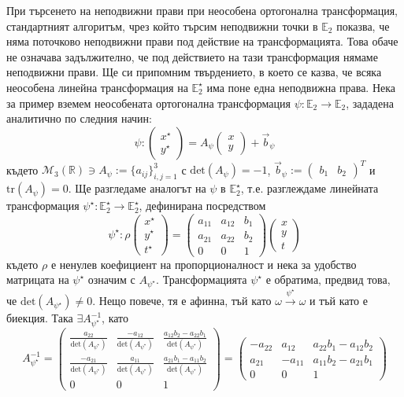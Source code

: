 \documentclass[12pt]{article}
\begin{document}
При търсенето на неподвижни прави при неособена ортогонална трансформация, стандартният алгоритъм, чрез който търсим неподвижни точки в $\mathbb{E}_2$ показва, че няма поточково неподвижни прави под действие на трансформацията. Това обаче не означава задължително, че под действието на тази трансформация нямаме неподвижни прави. Ще си припомним твърдението, в което се казва, че всяка неособена линейна трансформация на $\mathbb{E}_2^\star$ има поне една неподвижна права. Нека за пример вземем неособената ортогонална трансформация $\psi:\mathbb{E}_2\to\mathbb{E}_2$, зададена аналитично по следния начин: $$\psi:\begin{pmatrix} x^\star \\ y^\star\end{pmatrix}=A_\psi\begin{pmatrix} x \\ y \end{pmatrix}+\vec{b}_\psi$$ където $\mathcal M_3(\mathbb{R})\ni A_{\psi}:=\{a_{ij}\}_{i,j=1}^3$ с $\mathrm{det}(A_\psi)=-1$, $\vec{b}_\psi:=\begin{pmatrix} b_1 & b_2\end{pmatrix}^T$ и $\mathrm{tr}(A_{\psi})=0$. Ще разгледаме аналогът на $\psi$ в $\mathbb{E}_2^\star$, т.е. разглеждаме линейната трансформация $\psi^\star:\mathbb{E}_2^\star\to\mathbb{E}_2^\star$, дефинирана посредством $$\psi^\star:\rho\begin{pmatrix}x^\star \\ y^\star \\ t^\star\end{pmatrix}=\begin{pmatrix} a_{11} & a_{12} & b_1 \\ a_{21} & a_{22} & b_2 \\ 0 & 0 & 1\end{pmatrix}\begin{pmatrix} x \\ y \\ t\end{pmatrix}$$
където $\rho$ е ненулев коефициент на пропорционалност и нека за удобство матрицата на $\psi^\star$ означим с $A_{\psi^\star}$. Трансформацията $\psi^\star$ е обратима, предвид това, че $\mathrm{det}(A_{\psi^\star})\neq 0$. Нещо повече, тя е афинна, тъй като $\omega\xrightarrow{\psi^\star}\omega$ и тъй като е биекция. Така $\exists A_{\psi^\star}^{-1}$, като 
$$A_{\psi^\star}^{-1} = 
\begin{pmatrix} 
\frac{a_{22}}{\text{det}(A_{\psi^\star})} & \frac{-a_{12}}{\text{det}(A_{\psi^\star})} & \frac{a_{12}b_2 - a_{22}b_1}{\text{det}(A_{\psi^\star})} \\ 
\frac{-a_{21}}{\text{det}(A_{\psi^\star})} & \frac{a_{11}}{\text{det}(A_{\psi^\star})} & \frac{a_{21}b_1 - a_{11}b_2}{\text{det}(A_{\psi^\star})} \\ 
0 & 0 & 1\end{pmatrix}=\begin{pmatrix}-a_{22} & a_{12} & a_{22}b_1-a_{12}b_2 \\ 
a_{21} & -a_{11} & a_{11}b_2-a_{21}b_1\\ 
0 & 0 & 1\end{pmatrix}$$
\end{document}
